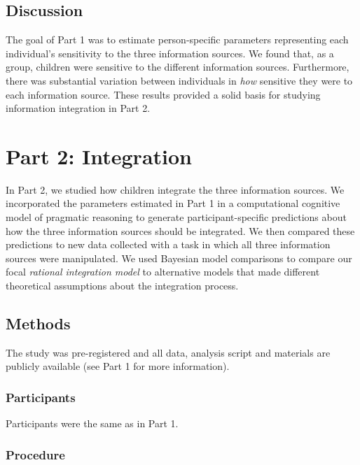 \documentclass[
  man,floatsintext]{apa6}
\begin{document}
\hypertarget{discussion}{%
\subsection{Discussion}\label{discussion}}

The goal of Part 1 was to estimate person-specific parameters representing each individual's sensitivity to the three information sources. We found that, as a group, children were sensitive to the different information sources. Furthermore, there was substantial variation between individuals in \emph{how} sensitive they were to each information source. These results provided a solid basis for studying information integration in Part 2.

\hypertarget{part-2-integration}{%
\section{Part 2: Integration}\label{part-2-integration}}

In Part 2, we studied how children integrate the three information sources. We incorporated the parameters estimated in Part 1 in a computational cognitive model of pragmatic reasoning to generate participant-specific predictions about how the three information sources should be integrated. We then compared these predictions to new data collected with a task in which all three information sources were manipulated. We used Bayesian model comparisons to compare our focal \emph{rational integration model} to alternative models that made different theoretical assumptions about the integration process.

\hypertarget{methods-1}{%
\subsection{Methods}\label{methods-1}}

The study was pre-registered and all data, analysis script and materials are publicly available (see Part 1 for more information).

\hypertarget{participants-1}{%
\subsubsection{Participants}\label{participants-1}}

Participants were the same as in Part 1.

\hypertarget{procedure-1}{%
\subsubsection{Procedure}\label{procedure-1}}
\end{document}
